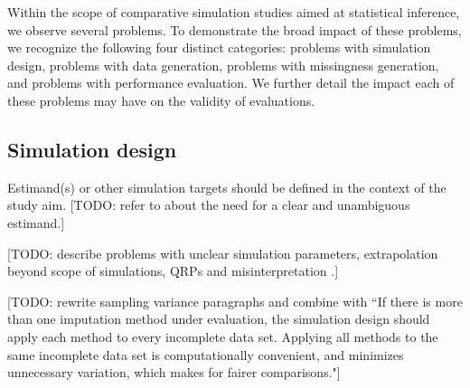 \documentclass[bimj,fleqn]{w-art}
\begin{document}
Within the scope of comparative simulation studies aimed at statistical inference, we observe several problems. To demonstrate the broad impact of these problems, we recognize the following four distinct categories: problems with simulation design, problems with data generation, problems with missingness generation, and problems with performance evaluation. We further detail the impact each of these problems may have on the validity of evaluations. 



\subsection{Simulation design}


Estimand(s) or other simulation targets should be defined in the context of the study aim. [TODO: refer to \citet{pete14} about the need for a clear and unambiguous estimand.] 

[TODO: describe problems with unclear simulation parameters, extrapolation beyond scope of simulations, QRPs \citep{pawe22} and misinterpretation \citep[see "investigator bias"][]{gree17}.]

[TODO: rewrite sampling variance paragraphs and combine with ``If there is more than one imputation method under evaluation, the simulation design should apply each method to every incomplete data set. Applying all methods to the same incomplete data set is computationally convenient, and minimizes unnecessary variation, which makes for fairer comparisons."]
\end{document}
